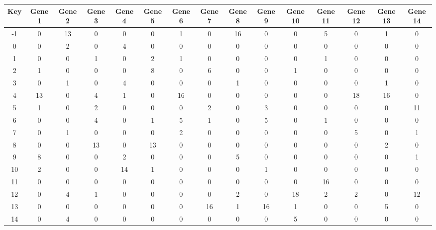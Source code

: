 \begin{tabular}{|c|c|c|c|c|c|c|c|c|c|c|c|c|c|c|}
\hline
Key & Gene 1 & Gene 2 & Gene 3 & Gene 4 & Gene 5 & Gene 6 & Gene 7 & Gene 8 & Gene 9 & Gene 10 & Gene 11 & Gene 12 & Gene 13 & Gene 14 \\
\hline
-1 & 0 & 13 & 0 & 0 & 0 & 1 & 0 & 16 & 0 & 0 & 5 & 0 & 1 & 0 \\
0 & 0 & 2 & 0 & 4 & 0 & 0 & 0 & 0 & 0 & 0 & 0 & 0 & 0 & 0 \\
1 & 0 & 0 & 1 & 0 & 2 & 1 & 0 & 0 & 0 & 0 & 1 & 0 & 0 & 0 \\
2 & 1 & 0 & 0 & 0 & 8 & 0 & 6 & 0 & 0 & 1 & 0 & 0 & 0 & 0 \\
3 & 0 & 1 & 0 & 4 & 0 & 0 & 0 & 1 & 0 & 0 & 0 & 0 & 1 & 0 \\
4 & 13 & 0 & 4 & 1 & 0 & 16 & 0 & 0 & 0 & 0 & 0 & 18 & 16 & 0 \\
5 & 1 & 0 & 2 & 0 & 0 & 0 & 2 & 0 & 3 & 0 & 0 & 0 & 0 & 11 \\
6 & 0 & 0 & 4 & 0 & 1 & 5 & 1 & 0 & 5 & 0 & 1 & 0 & 0 & 0 \\
7 & 0 & 1 & 0 & 0 & 0 & 2 & 0 & 0 & 0 & 0 & 0 & 5 & 0 & 1 \\
8 & 0 & 0 & 13 & 0 & 13 & 0 & 0 & 0 & 0 & 0 & 0 & 0 & 2 & 0 \\
9 & 8 & 0 & 0 & 2 & 0 & 0 & 0 & 5 & 0 & 0 & 0 & 0 & 0 & 1 \\
10 & 2 & 0 & 0 & 14 & 1 & 0 & 0 & 0 & 1 & 0 & 0 & 0 & 0 & 0 \\
11 & 0 & 0 & 0 & 0 & 0 & 0 & 0 & 0 & 0 & 0 & 16 & 0 & 0 & 0 \\
12 & 0 & 4 & 1 & 0 & 0 & 0 & 0 & 2 & 0 & 18 & 2 & 2 & 0 & 12 \\
13 & 0 & 0 & 0 & 0 & 0 & 0 & 16 & 1 & 16 & 1 & 0 & 0 & 5 & 0 \\
14 & 0 & 4 & 0 & 0 & 0 & 0 & 0 & 0 & 0 & 5 & 0 & 0 & 0 & 0 \\
\hline
\end{tabular}
